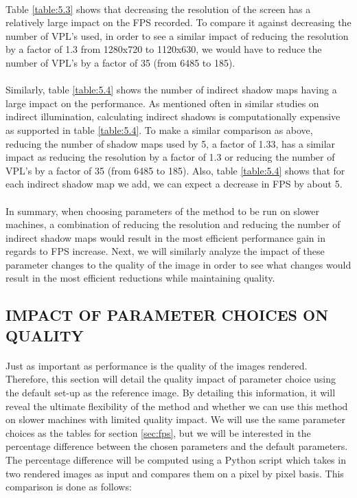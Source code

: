 \paragraph{}
Table \ref{table:5.3} shows that decreasing the resolution of the screen has a relatively large impact on the FPS recorded.  To compare it against decreasing the number of VPL's used, in order to see a similar impact of reducing the resolution by a factor of 1.3 from 1280x720 to 1120x630, we would have to reduce the number of VPL's by a factor of 35 (from 6485 to 185).

\paragraph{}
Similarly, table \ref{table:5.4} shows the number of indirect shadow maps having a large impact on the performance.  As mentioned often in similar studies on indirect illumination, calculating indirect shadows is computationally expensive as supported in table \ref{table:5.4}.  To make a similar comparison as above, reducing the number of shadow maps used by 5, a factor of 1.33, has a similar impact as reducing the resolution by a factor of 1.3 or reducing the number of VPL's by a factor of 35 (from 6485 to 185).  Also, table \ref{table:5.4} shows that for each indirect shadow map we add, we can expect a decrease in FPS by about 5.

\paragraph{}
In summary, when choosing parameters of the method to be run on slower machines, a combination of reducing the resolution and reducing the number of indirect shadow maps would result in the most efficient performance gain in regards to FPS increase.  Next, we will similarly analyze the impact of these parameter changes to the quality of the image in order to see what changes would result in the most efficient reductions while maintaining quality.

\subsection{IMPACT OF PARAMETER CHOICES ON QUALITY} \label{sec:quality}
\paragraph{}
Just as important as performance is the quality of the images rendered.  Therefore, this section will detail the quality impact of parameter choice using the default set-up as the reference image.  By detailing this information, it will reveal the ultimate flexibility of the method and whether we can use this method on slower machines with limited quality impact.  We will use the same parameter choices as the tables for section \ref{sec:fps}, but we will be interested in the percentage difference between the chosen parameters and the default parameters.  The percentage difference will be computed using a Python script which takes in two rendered images as input and compares them on a pixel by pixel basis.  This comparison is done as follows:


